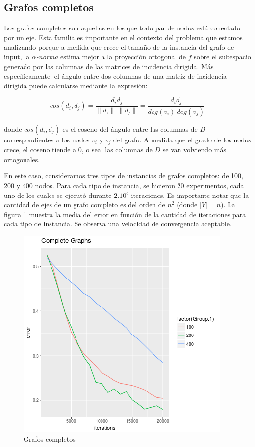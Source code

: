 \documentclass[conference,compsoc,a4paper]{IEEEtran}
\begin{document}
\subsection{Grafos completos}

Los grafos completos son aquellos en los que todo par de nodos está 
conectado por un eje. Esta familia es importante en el contexto del 
problema que estamos analizando porque a medida que crece el tamaño de 
la instancia del grafo de input, la \emph{$\alpha$-norma} estima mejor a 
la proyección ortogonal de $f$ sobre el subespacio generado por las 
columnas de las matrices de incidencia dirigida. Más específicamente, 
el ángulo entre dos columnas de una matriz de incidencia dirigida puede 
calcularse mediante la expresión:

$$cos(d_i,d_j) = \frac{d_i d_j}{\|d_i\| \ \|d_j\|} = 
\frac{d_i d_j}{deg(v_i) \ deg(v_j)}$$

donde $cos(d_i,d_j)$ es el coseno del ángulo entre las columnas de $D$ 
correspondientes a los nodos $v_i$ y $v_j$ del grafo. A medida que el 
grado de los nodos crece, el coseno tiende a $0$, o sea: las columnas 
de $D$ se van volviendo más ortogonales.

\smallskip

En este caso, consideramos tres tipos de instancias de grafos 
completos: de 100, 200 y 400 nodos. Para cada tipo de instancia, se 
hicieron 20 experimentos, cada uno de los cuales se ejecutó durante 
$2 . 10^4$ iteraciones. Es importante notar que la cantidad de ejes de 
un grafo completo es del orden de $n^2$ (donde $|V| = n$).  La figura 
\ref{fig:complete} muestra la media del error en función de la cantidad 
de iteraciones para cada tipo de instancia. Se observa una velocidad de 
convergencia aceptable.


\begin{figure}
	\includegraphics[width=\linewidth]{complete_graphs.png} %
	\caption{Grafos completos} %
	\label{fig:complete} %
\end{figure}
\end{document}
